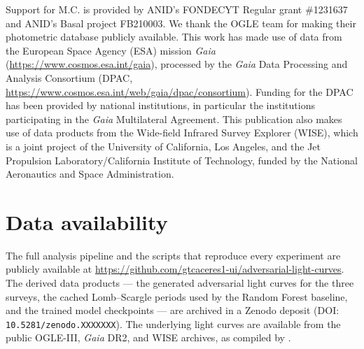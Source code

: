 \documentclass{aa}
\begin{document}


\begin{acknowledgements}
Support for M.C. is provided by ANID’s FONDECYT Regular grant \#1231637 and ANID’s Basal project FB210003. 
We thank the OGLE team for making their photometric database publicly
available. This work has made use of data from the European Space Agency
(ESA) mission \textit{Gaia}
(\url{https://www.cosmos.esa.int/gaia}), processed by the \textit{Gaia}
Data Processing and Analysis Consortium (DPAC,
\url{https://www.cosmos.esa.int/web/gaia/dpac/consortium}). Funding for
the DPAC has been provided by national institutions, in particular the
institutions participating in the \textit{Gaia} Multilateral Agreement.
This publication also makes use of data products from the Wide-field
Infrared Survey Explorer (WISE), which is a joint project of the
University of California, Los Angeles, and the Jet Propulsion
Laboratory/California Institute of Technology, funded by the National
Aeronautics and Space Administration.
\end{acknowledgements}

\section*{Data availability}
The full analysis pipeline and the scripts that reproduce every experiment
are publicly available at
\url{https://github.com/gtcaceres1-ui/adversarial-light-curves}. The
derived data products --- the generated adversarial light curves for the
three surveys, the cached Lomb--Scargle periods used by the Random Forest
baseline, and the trained model checkpoints --- are archived in a Zenodo
deposit (DOI: \texttt{10.5281/zenodo.XXXXXXX}).
The underlying light curves are available from the public OGLE-III,
\textit{Gaia} DR2, and WISE archives, as compiled by \citet{becker2020scalable}.




\appendix
\end{document}
